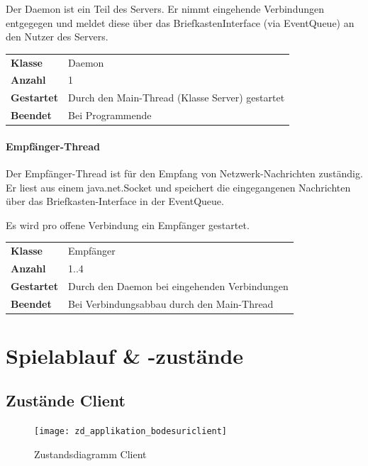 \documentclass[12pt,halfparskip]{scrartcl}
\begin{document}
Der Daemon ist ein Teil des Servers. Er nimmt eingehende Verbindungen entgegegen und meldet diese über das BriefkastenInterface (via EventQueue) an den Nutzer des Servers.

\begin{tabular}{@{} l p{12.5cm}}
\textbf{Klasse}       & Daemon \\
\textbf{Anzahl}       & 1 \\
\textbf{Gestartet}    & Durch den Main-Thread (Klasse Server) gestartet \\
\textbf{Beendet}      & Bei Programmende
\end{tabular}


\paragraph{Empfänger-Thread} %
\label{ssub:empfänger_thread}

Der Empfänger-Thread ist für den Empfang von Netzwerk-Nachrichten zuständig. Er liest aus einem java.net.Socket und speichert die eingegangenen Nachrichten über das Briefkasten-Interface in der EventQueue.

Es wird pro offene Verbindung ein Empfänger gestartet.


\begin{tabular}{@{} l p{12.5cm}}
\textbf{Klasse}       & Empfänger \\
\textbf{Anzahl}       & 1..4 \\
\textbf{Gestartet}    & Durch den Daemon bei eingehenden Verbindungen  \\
\textbf{Beendet}      & Bei Verbindungsabbau durch den Main-Thread
\end{tabular}


\clearpage
\section{Spielablauf \& -zustände} %
\label{spielzustaende_nachrichten}
\subsection{Zustände Client} %
\label{sub:zustände_client}
\begin{figure}[h]
	\centering
	\texttt{[image: zd\_applikation\_bodesuriclient]}
	\caption{Zustandsdiagramm Client}
	\label{fig:zd_applikation_bodesuriclient}
\end{figure}
\end{document}
